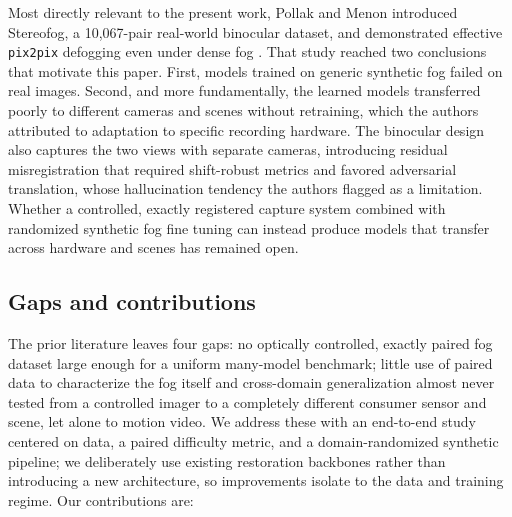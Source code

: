 \documentclass{optica-article}
\begin{document}
Most directly relevant to the present work, Pollak and Menon
introduced Stereofog, a 10{,}067-pair real-world binocular dataset,
and demonstrated effective \texttt{pix2pix} defogging even under
dense fog \cite{pollak2024stereofog}. That study reached two
conclusions that motivate this paper. First, models trained on
generic synthetic fog failed on real images. Second, and more
fundamentally, the learned models transferred poorly to different
cameras and scenes without retraining, which the authors attributed
to adaptation to specific recording hardware. The binocular design
also captures the two views with separate cameras, introducing
residual misregistration that required shift-robust metrics and
favored adversarial translation, whose hallucination tendency the
authors flagged as a limitation. Whether a controlled,
exactly registered capture system combined with randomized synthetic fog fine tuning can instead produce models that transfer across hardware and scenes has remained open.
 
\subsection{Gaps and contributions}
\label{sec:contributions}

The prior literature leaves four gaps: no optically controlled,
exactly paired fog dataset large enough for a uniform many-model
benchmark; little use of paired data to characterize the fog
itself and cross-domain generalization almost never tested from a
controlled imager to a completely different consumer sensor and
scene, let alone to motion video. We address these with an
end-to-end study centered on data, a paired difficulty metric, and
a domain-randomized synthetic pipeline; we deliberately use existing
restoration backbones rather than introducing a new architecture,
so improvements isolate to the data and training regime. Our
contributions are:
\end{document}
